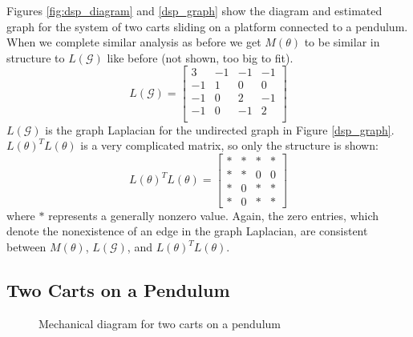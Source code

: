 \documentclass[conference]{IEEEtran}
\begin{document}
Figures \ref{fig:dsp_diagram} and \ref{dsp_graph} show the diagram and estimated graph for the system of two carts sliding on a platform connected to a
pendulum. When we complete similar analysis as before we get $M(\theta)$ to be similar in structure to $L(\mathcal{G})$ like before (not shown, too big to fit).
$$
L(\mathcal{G})=\begin{bmatrix}
    3 & -1 & -1 & -1\\
    -1 & 1 & 0 & 0\\
    -1 & 0 & 2 & -1\\
    -1 & 0 & -1 & 2\\
\end{bmatrix}
$$
$L(\mathcal{G})$ is the graph Laplacian for the undirected graph in Figure \ref{dsp_graph}. $L(\theta)^TL(\theta)$ is a very complicated matrix, so only the structure is shown:
$$
L(\theta)^TL(\theta)=\begin{bmatrix}
    * & * & * & *\\
    * & * & 0 & 0\\
    * & 0 & * & *\\
    * & 0 & * & *
\end{bmatrix}
$$
where $*$ represents a generally nonzero value. Again, the zero entries, which denote the nonexistence of an edge in the graph Laplacian, are consistent between $M(\theta)$, $L(\mathcal{G})$, and $L(\theta)^TL(\theta)$.

\subsection{Two Carts on a Pendulum}
\begin{figure}[htbp]
    \centering
    \caption{Mechanical diagram for two carts on a pendulum}
    \label{fig:ccp1_diagram}
\end{figure}
\end{document}
